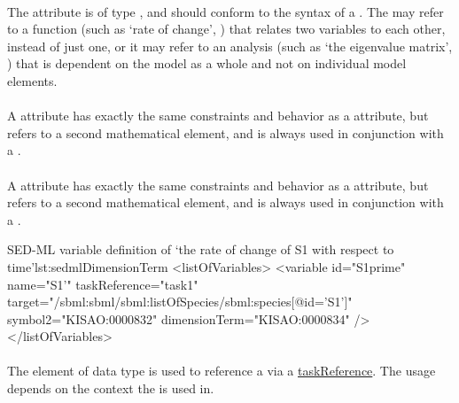 \begin{blockChanged}
\paragraph*{}
\label{sec:term}
The  attribute is of type , and should conform to the syntax of a \kisaoID.  The  may refer to a function (such as `rate of change', ) that relates two variables to each other, instead of just one, or it may refer to an analysis (such as `the eigenvalue matrix', ) that is dependent on the model as a whole and not on individual model elements.

\paragraph*{}
\label{sec:target2}
A  attribute has exactly the same constraints and behavior as a  attribute, but refers to a second mathematical element, and is always used in conjunction with a .

\paragraph*{}
\label{sec:symbol2}
A  attribute has exactly the same constraints and behavior as a  attribute, but refers to a second mathematical element, and is always used in conjunction with a .


\begin{myXmlLst}{SED-ML variable definition of `the rate of change of S1 with respect to time'}{lst:sedmlDimensionTerm}
<listOfVariables>
	<variable id="S1prime" name="S1'"  taskReference="task1"
		target="/sbml:sbml/sbml:listOfSpecies/sbml:species[@id='S1']"
		symbol2="KISAO:0000832"
		dimensionTerm="KISAO:0000834" />
</listOfVariables>
\end{myXmlLst}

\end{blockChanged}


\paragraph*{}
\label{sec:taskReferenceAttribute}
The  element of data type \SIdRef is used to reference a \Task via a \hyperref[sec:taskReference]{taskReference}. The usage depends on the context the \Variable is used in.

